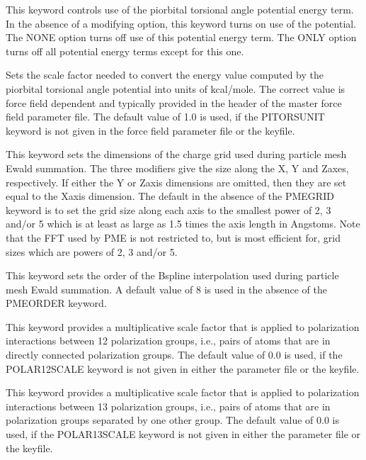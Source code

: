 \documentclass[letterpaper,11pt,english]{sphinxmanual}
\begin{document}
  This keyword controls use of the pi\sphinxhyphen{}orbital torsional angle potential energy term. In the absence of a modifying option, this keyword turns on use of the potential. The NONE option turns off use of this potential energy term. The ONLY option turns off all potential energy terms except for this one.

  Sets the scale factor needed to convert the energy value computed by the pi\sphinxhyphen{}orbital torsional angle potential into units of kcal/mole. The correct value is force field dependent and typically provided in the header of the master force field parameter file. The default value of 1.0 is used, if the PITORSUNIT keyword is not given in the force field parameter file or the keyfile.

  This keyword sets the dimensions of the charge grid used during particle mesh Ewald summation. The three modifiers give the size along the X\sphinxhyphen{}, Y\sphinxhyphen{} and Z\sphinxhyphen{}axes, respectively. If either the Y\sphinxhyphen{} or Z\sphinxhyphen{}axis dimensions are omitted, then they are set equal to the X\sphinxhyphen{}axis dimension. The default in the absence of the PME\sphinxhyphen{}GRID keyword is to set the grid size along each axis to the smallest power of 2, 3 and/or 5 which is at least as large as 1.5 times the axis length in Angstoms. Note that the FFT used by PME is not restricted to, but is most efficient for, grid sizes which are powers of 2, 3 and/or 5.

  This keyword sets the order of the B\sphinxhyphen{}spline interpolation used during particle mesh Ewald summation. A default value of 8 is used in the absence of the PME\sphinxhyphen{}ORDER keyword.

  This keyword provides a multiplicative scale factor that is applied to polarization interactions between 1\sphinxhyphen{}2 polarization groups, i.e., pairs of atoms that are in directly connected polarization groups. The default value of 0.0 is used, if the POLAR\sphinxhyphen{}12\sphinxhyphen{}SCALE keyword is not given in either the parameter file or the keyfile.

  This keyword provides a multiplicative scale factor that is applied to polarization interactions between 1\sphinxhyphen{}3 polarization groups, i.e., pairs of atoms that are in polarization groups separated by one other group. The default value of 0.0 is used, if the POLAR\sphinxhyphen{}13\sphinxhyphen{}SCALE keyword is not given in either the parameter file or the keyfile.
\end{document}

